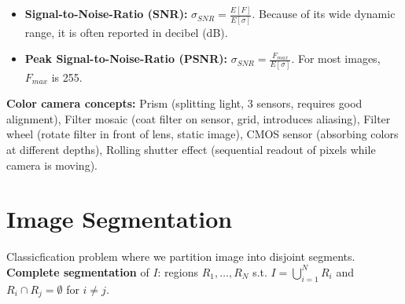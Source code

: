 \documentclass[a4paper,9pt]{article}
\begin{document}
\begin{itemize}
    \item \textbf{Signal-to-Noise-Ratio (SNR):} $\sigma_{SNR} = \frac{E[F]}{E[\sigma]}$. Because of its wide dynamic range, it is often reported in decibel (dB).
    
    \item \textbf{Peak Signal-to-Noise-Ratio (PSNR):} $\sigma_{SNR} = \frac{F_{max}}{E[\sigma]}$. For most images, $F_{max}$ is 255.
\end{itemize}
\textbf{Color camera concepts:} Prism (splitting light, 3 sensors, requires good alignment), Filter mosaic (coat filter on sensor, grid, introduces aliasing), Filter wheel (rotate filter in front of lens, static image), CMOS sensor (absorbing colors at different depths), Rolling shutter effect (sequential readout of pixels while camera is moving).
\section{Image Segmentation}
Classicfication problem where we partition image into disjoint segments.
\textbf{Complete segmentation} of $I$: regions $R_1, \dots, R_N$ s.t. $I = \bigcup_{i=1}^{N} R_i$ and $R_i \cap R_j = \emptyset$ for $i \ne j$.
\end{document}
